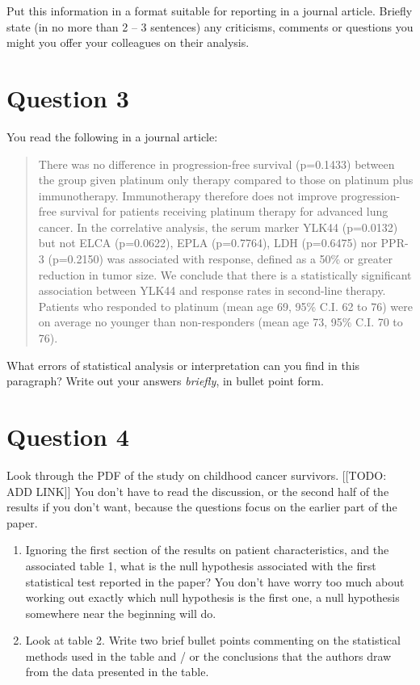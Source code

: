 \documentclass[]{book}
\begin{document}
Put this information in a format suitable for reporting in a journal
article. Briefly state (in no more than 2 -- 3 sentences) any
criticisms, comments or questions you might you offer your colleagues on
their analysis.

\hypertarget{question-3}{%
\section{Question 3}\label{question-3}}

You read the following in a journal article:

\begin{quote}
There was no difference in progression-free survival (p=0.1433) between
the group given platinum only therapy compared to those on platinum plus
immunotherapy. Immunotherapy therefore does not improve progression-free
survival for patients receiving platinum therapy for advanced lung
cancer. In the correlative analysis, the serum marker YLK44 (p=0.0132)
but not ELCA (p=0.0622), EPLA (p=0.7764), LDH (p=0.6475) nor PPR-3
(p=0.2150) was associated with response, defined as a 50\% or greater
reduction in tumor size. We conclude that there is a statistically
significant association between YLK44 and response rates in second-line
therapy. Patients who responded to platinum (mean age 69, 95\% C.I. 62
to 76) were on average no younger than non-responders (mean age 73, 95\%
C.I. 70 to 76).
\end{quote}

What errors of statistical analysis or interpretation can you find in
this paragraph? Write out your answers \emph{briefly}, in bullet point
form.

\hypertarget{question-4}{%
\section{Question 4}\label{question-4}}

Look through the PDF of the study on childhood cancer survivors.
{[}{[}TODO: ADD LINK{]}{]} You don't have to read the discussion, or the
second half of the results if you don't want, because the questions
focus on the earlier part of the paper.

\begin{enumerate}
\def\labelenumi{\alph{enumi})}
\item
  Ignoring the first section of the results on patient characteristics,
  and the associated table 1, what is the null hypothesis associated
  with the first statistical test reported in the paper? You don't have
  worry too much about working out exactly which null hypothesis is the
  first one, a null hypothesis somewhere near the beginning will do.
\item
  Look at table 2. Write two brief bullet points commenting on the
  statistical methods used in the table and / or the conclusions that
  the authors draw from the data presented in the table.
\end{enumerate}
\end{document}

